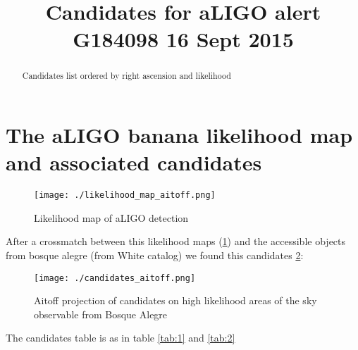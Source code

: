 \documentclass[a4paper,10pt]{article}
\title{Candidates for aLIGO alert G184098 16 Sept 2015}
\author{}
\begin{document}
\maketitle

\begin{abstract}
Candidates list ordered by right ascension and likelihood
\end{abstract}

\section{The aLIGO banana likelihood map and associated candidates}
\begin{figure}
 \centering
 \texttt{[image: ./likelihood\_map\_aitoff.png]}
 \caption{Likelihood map of aLIGO detection}
 \label{fig:1}
\end{figure}

After a crossmatch between this likelihood maps (\ref{fig:1}) and 
the accessible objects from bosque alegre (from White catalog)
we found this candidates \ref{fig:candidates_aitoff}:

\begin{figure}
 \centering
 \texttt{[image: ./candidates\_aitoff.png]}
 \caption{Aitoff projection of candidates on high likelihood areas of the sky observable from Bosque Alegre}
 \label{fig:candidates_aitoff}
\end{figure}

The candidates table is as in table \ref{tab:1} and \ref{tab:2}
\end{document}
